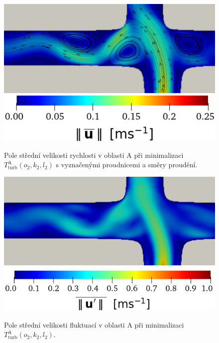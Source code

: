 \vspace{4mm}
\begin{figure}[H]
	\centering
	\includegraphics[width=0.75
	\textwidth]{Images/tcpc/tcpc_tke_veloc_a3.png}\\[16pt]
	\includegraphics[width=0.46	\textwidth]{Images/tcpc/tcpc_dotgamma_veloc_legenda.png}
	\caption{Pole střední velikosti rychlosti v oblasti A při minimalizaci $ T^{\text{A}}_{\text{turb}} (o_2, k_2, l_2) $ s vyznačenými proudnicemi a směry proudění.}
	\label{fig:tcpc tke veloc}
\end{figure}
\begin{figure}[H]
	\centering
	\includegraphics[width=0.75	\textwidth]{Images/tcpc/tcpc_tke_fluc_a.png}\\[16pt]
	\includegraphics[width=0.55	\textwidth]{Images/tcpc/tcpc_dotgamma_fluc_legenda.png}
	\caption{Pole střední velikosti fluktuací  v oblasti A při minimalizaci $ T^{\text{A}}_{\text{turb}} (o_2, k_2, l_2) $.}
	\label{fig:tcpc tke fluc}
	\vspace{2mm}
\end{figure}
